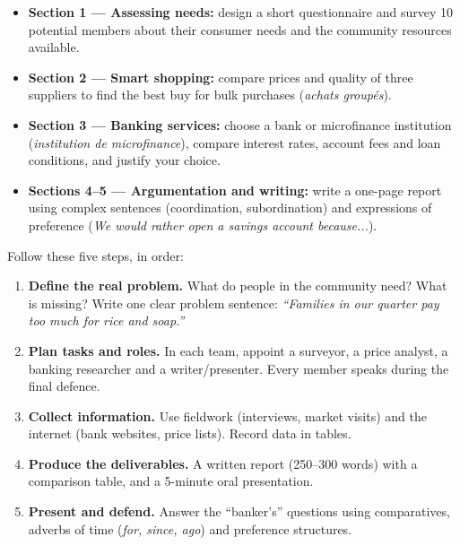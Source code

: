 \documentclass[11pt]{article}
\newcommand{\cle}[1]{{\popxbold\color{popdark}#1}}
\begin{document}
\begin{itemize}
\item \textbf{Section 1 — Assessing needs:} design a short questionnaire and survey 10 potential members about their consumer needs and the community resources available.
\item \textbf{Section 2 — Smart shopping:} compare prices and quality of three suppliers to find the \cle{best buy} for bulk purchases (\emph{achats groupés}).
\item \textbf{Section 3 — Banking services:} choose a bank or microfinance institution (\emph{institution de microfinance}), compare \cle{interest rates}, \cle{account fees} and \cle{loan conditions}, and justify your choice.
\item \textbf{Sections 4–5 — Argumentation and writing:} write a one-page report using complex sentences (coordination, subordination) and expressions of preference (\emph{We would rather open a savings account because...}).
\end{itemize}

\begin{methode}
Follow these five steps, in order:
\begin{enumerate}
\item \textbf{Define the real problem.} What do people in the community need? What is missing? Write one clear problem sentence: \emph{``Families in our quarter pay too much for rice and soap.''}
\item \textbf{Plan tasks and roles.} In each team, appoint a \cle{surveyor}, a \cle{price analyst}, a \cle{banking researcher} and a \cle{writer/presenter}. Every member speaks during the final defence.
\item \textbf{Collect information.} Use fieldwork (interviews, market visits) and the internet (bank websites, price lists). Record data in tables.
\item \textbf{Produce the deliverables.} A written report (250--300 words) with a comparison table, and a 5-minute oral presentation.
\item \textbf{Present and defend.} Answer the ``banker's'' questions using comparatives, adverbs of time (\emph{for, since, ago}) and preference structures.
\end{enumerate}
\end{methode}
\end{document}
